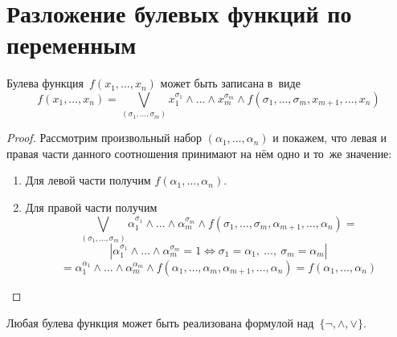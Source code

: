 \section{Разложение булевых функций по переменным}
\begin{theorem}
Булева функция~$f(x_1, \ldots, x_n)$ может быть записана в~виде
\begin{equation*}
f(x_1, \ldots, x_n) = \bigvee_{(\sigma_1, \ldots, \sigma_m)}
x_1^{\sigma_1} \land \ldots \land x_m^{\sigma_m} \land f(\sigma_1, \ldots, \sigma_m, x_{m+1}, \ldots, x_n)
\end{equation*}
\end{theorem}
\begin{proof}
Рассмотрим произвольный набор $(\alpha_1, \ldots, \alpha_n)$ и покажем, что левая и правая части данного соотношения принимают на нём одно и то~же значение:
\begin{enumerate}
	\item Для левой части получим $f(\alpha_1, \ldots, \alpha_n)$.
	\item Для правой части получим
	\begin{equation*}
	\bigvee_{(\sigma_1, \ldots, \sigma_m)}
	\alpha_1^{\sigma_1} \land \ldots \land \alpha_m^{\sigma_m} \land f(\sigma_1, \ldots, \sigma_m, \alpha_{m+1}, \ldots, \alpha_n) =
	\end{equation*}
	\begin{equation*}
	\left| \alpha_1^{\sigma_1} \land \ldots \land \alpha_m^{\sigma_m} = 1 \Leftrightarrow
	\sigma_1 = \alpha_1, \ \ldots, \ \sigma_m = \alpha_m \right|
	\end{equation*}
	\begin{equation*}
	= \alpha_1^{\alpha_1} \land \ldots \land \alpha_m^{\alpha_m} \land f(\alpha_1, \ldots, \alpha_m, \alpha_{m+1}, \ldots, \alpha_n)
	= f(\alpha_1, \ldots, \alpha_n)
	\end{equation*}
\end{enumerate}
\end{proof}

\begin{consequent}
Любая булева функция может быть реализована формулой над~$\{ \neg, \land, \lor \}$.
\end{consequent}